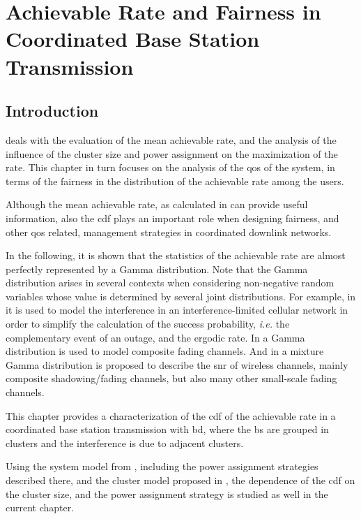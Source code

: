 \chapter[Rate Statistics]{Achievable Rate and Fairness in Coordinated Base Station Transmission}\label{ch:rate_statistics}

\section{Introduction}\label{sec:stats_intro}

 deals with the evaluation of the mean achievable rate,
and the analysis of the influence of the cluster size and power assignment on
the maximization of the rate. This chapter in turn focuses on the analysis of
the \gls{qos} of the system, in terms of the fairness in the distribution of the
achievable rate among the users.

Although the mean achievable rate, as calculated in  can
provide useful information, also the \gls{cdf} plays an important role when
designing fairness, and other \gls{qos} related, management strategies in
coordinated downlink networks.

In the following, it is shown that the statistics of the achievable rate are
almost perfectly represented by a Gamma distribution. Note that the Gamma
distribution arises in several contexts when considering non-negative random
variables whose value is determined by several joint distributions. For example,
in \cite{heath13} it is used to model the interference in an
interference-limited cellular network in order to simplify the calculation of
the success probability, \emph{i.e.} the complementary event of an outage, and
the ergodic rate. In \cite{alahmadi10} a Gamma distribution is used to model
composite fading channels. And in \cite{atapattu11} a mixture Gamma distribution
is proposed to describe the \gls{snr} of wireless channels, mainly composite
shadowing/fading channels, but also many other small-scale fading channels.

This chapter provides a characterization of the \gls{cdf} of the achievable rate
in a coordinated base station transmission with \gls{bd}, where the \gls{bs} are
grouped in clusters and the interference is due to adjacent clusters.

Using the system model from , including the power
assignment strategies described there, and the cluster model proposed in
, the dependence of the \gls{cdf} on the cluster
size, and the power assignment strategy is studied as well in the current
chapter.

